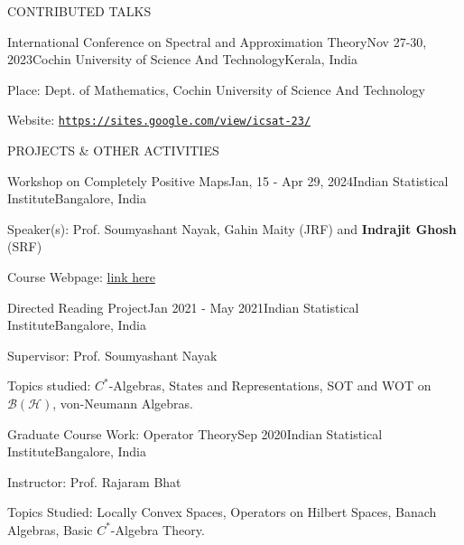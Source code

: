 \documentclass{resume} %
\newcommand{\weblink}[1]{\texttt{\href{#1}{#1}}}
\begin{document}
\begin{rSection}{CONTRIBUTED TALKS}
	
	\begin{rSubsection}{International Conference on Spectral and Approximation Theory}{Nov 27-30, 2023}{Cochin University of Science And Technology}{Kerala, India}
		\item Place: Dept. of Mathematics, Cochin University of Science And Technology 
		\item Website: \weblink{https://sites.google.com/view/icsat-23/}
	\end{rSubsection}
	
\end{rSection}


\begin{rSection}{PROJECTS \& OTHER ACTIVITIES}
	
	\begin{rSubsection}{Workshop on Completely Positive Maps}{Jan, 15 - Apr 29, 2024}{Indian Statistical Institute}{Bangalore, India}
		\item Speaker(s): Prof. Soumyashant Nayak, Gahin Maity (JRF) and {\bf Indrajit Ghosh} (SRF)
		\item Course Webpage: \href{https://indrajitghosh.onrender.com/teaching/isibc/intro_to_cp_even_2024.html}{link here}
	\end{rSubsection}
	
	\begin{rSubsection}{Directed Reading Project}{Jan 2021 - May 2021}{Indian Statistical Institute}{Bangalore, India}
		\item Supervisor: Prof. Soumyashant Nayak
		\item Topics studied: $C^*$-Algebras, States and Representations, SOT and WOT on $\mathcal{B}(\mathcal{H})$, von-Neumann Algebras.
	\end{rSubsection}

	\begin{rSubsection}{Graduate Course Work: Operator Theory}{Sep 2020}{Indian Statistical Institute}{Bangalore, India}
		\item Instructor: Prof. Rajaram Bhat
		\item Topics Studied: Locally Convex Spaces, Operators on Hilbert Spaces, Banach Algebras, Basic $C^*$-Algebra Theory.
	\end{rSubsection}

\end{rSection}
\end{document}
